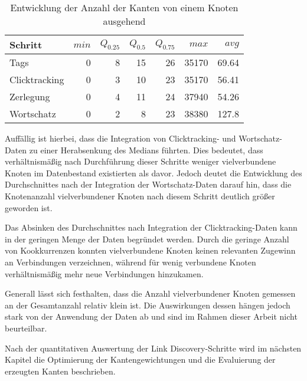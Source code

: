 \begin{table}
\centering
\begin{tabular}{lrrrrrr}
    \toprule
    Schritt & \(min\) & \(Q_{0.25}\) & \(Q_{0.5}\) & \(Q_{0.75}\) & \(max\) & \(avg\) \\
    \midrule
    Tags & \num{0} & \num{8} & \num{15} & \num{26} & \num{35170} & \num{69,64} \\
    Clicktracking & \num{0} & \num{3} & \num{10} & \num{23} & \num{35170} & \num{56,41} \\
    Zerlegung & \num{0} & \num{4} & \num{11} & \num{24} & \num{37940} & \num{54,26} \\
    Wortschatz & \num{0} & \num{2} & \num{8} & \num{23} & \num{38380} & \num{127,8} \\
    \bottomrule
\end{tabular}
\caption{Entwicklung der Anzahl der Kanten von einem Knoten ausgehend}
\label{tab:discovery_edges_per_node}
\end{table}

Auffällig ist hierbei, dass die Integration von Clicktracking- und Wortschatz-Daten zu einer Herabsenkung des Medians führten. Dies bedeutet, dass verhältnismäßig nach Durchführung dieser Schritte weniger vielverbundene Knoten im Datenbestand existierten als davor. Jedoch deutet die Entwicklung des Durchschnittes nach der Integration der Wortschatz-Daten darauf hin, dass die Knotenanzahl vielverbundener Knoten nach diesem Schritt deutlich größer geworden ist.

Das Absinken des Durchschnittes nach Integration der Clicktracking-Daten kann in der geringen Menge der Daten begründet werden. Durch die geringe Anzahl von Kookkurrenzen konnten vielverbundene Knoten keinen relevanten Zugewinn an Verbindungen verzeichnen, während für wenig verbundene Knoten verhältnismäßig mehr neue Verbindungen hinzukamen.

Generall lässt sich festhalten, dass die Anzahl vielverbundener Knoten gemessen an der Gesamtanzahl relativ klein ist. Die Auswirkungen dessen hängen jedoch stark von der Anwendung der Daten ab und sind im Rahmen dieser Arbeit nicht beurteilbar.

Nach der quantitativen Auswertung der Link Discovery-Schritte wird im nächsten Kapitel die Optimierung der Kantengewichtungen und die Evaluierung der erzeugten Kanten beschrieben.